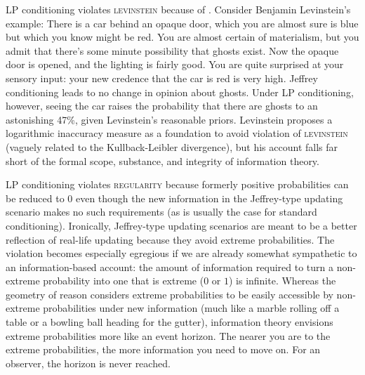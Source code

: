 \documentclass[11pt]{article}
\begin{document}
LP conditioning violates \textsc{levinstein} because of 
. Consider Benjamin Levinstein's example:
There is a car behind an opaque door, which you are almost sure is
blue but which you know might be red. You are almost certain of
materialism, but you admit that there's some minute possibility that
ghosts exist. Now the opaque door is opened, and the lighting is
fairly good. You are quite surprised at your sensory input: your new
credence that the car is red is very high. Jeffrey conditioning leads
to no change in opinion about ghosts. Under LP conditioning, however,
seeing the car raises the probability that there are ghosts to an
astonishing 47\%, given Levinstein's reasonable priors. Levinstein
proposes a logarithmic inaccuracy measure as a foundation to avoid
violation of \textsc{levinstein} (vaguely related to the
Kullback-Leibler divergence), but his account falls far short of the
formal scope, substance, and integrity of information theory.

LP conditioning violates \textsc{regularity} because formerly positive
probabilities can be reduced to $0$ even though the new information in
the Jeffrey-type updating scenario makes no such requirements (as is
usually the case for standard conditioning). Ironically, Jeffrey-type
updating scenarios are meant to be a better reflection of real-life
updating because they avoid extreme probabilities. The violation
becomes especially egregious if we are already somewhat sympathetic to
an information-based account: the amount of information required to
turn a non-extreme probability into one that is extreme ($0$ or $1$)
is infinite. Whereas the geometry of reason considers extreme
probabilities to be easily accessible by non-extreme probabilities
under new information (much like a marble rolling off a table or a
bowling ball heading for the gutter), information theory envisions
extreme probabilities more like an event horizon. The nearer you are
to the extreme probabilities, the more information you need to move
on. For an observer, the horizon is never reached.
\end{document}
